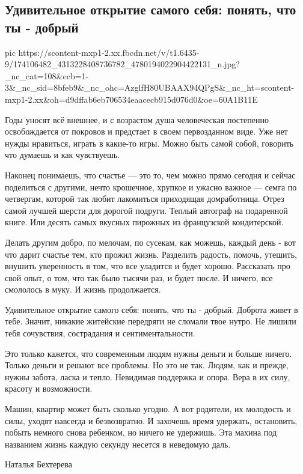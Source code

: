  
 
 
 
 
\subsection{Удивительное открытие самого себя: понять, что ты - добрый}
\label{sec:15_04_2021.fb.kotova_ksenia.1.dobro}

\ifcmt
  pic https://scontent-mxp1-2.xx.fbcdn.net/v/t1.6435-9/174106482_4313228408736782_4780194022904422131_n.jpg?_nc_cat=108&ccb=1-3&_nc_sid=8bfeb9&_nc_ohc=AzglfH80UBAAX94QPgS&_nc_ht=scontent-mxp1-2.xx&oh=d9dffab6eb706534eaacecb915d076d0&oe=60A1B11E
\fi

Годы уносят всё внешнее, и с возрастом душа человеческая постепенно
освобождается от покровов и предстает в своем первозданном виде. Уже нет нужды
нравиться, играть в какие-то игры. Можно быть самой собой, говорить что думаешь
и как чувствуешь.

Наконец понимаешь, что счастье — это то, чем можно прямо сегодня и сейчас
поделиться с другими, нечто крошечное, хрупкое и ужасно важное — семга по
четвергам, которой так любит лакомиться приходящая домработница. Отрез самой
лучшей шерсти для дорогой подруги. Теплый автограф на подаренной книге. Или
десять самых вкусных пирожных из французской кондитерской.

Делать другим добро, по мелочам, по сусекам, как можешь, каждый день - вот что
дарит счастье тем, кто прожил жизнь. Разделить радость, помочь, утешить,
внушить уверенность в том, что все уладится и будет хорошо. Рассказать про свой
опыт, о том, что так было тысячи раз, и будет после. И ничего, все смололось в
муку. И жизнь продолжается.

Удивительное открытие самого себя: понять, что ты - добрый. Доброта живет в
тебе. Значит, никакие житейские передряги не сломали твое нутро. Не лишили тебя
сочувствия, сострадания и сентиментальности.

Это только кажется, что современным людям нужны деньги и больше ничего. Только
деньги и решают все проблемы. Но это не так. Людям, как и прежде, нужны забота,
ласка и тепло. Невидимая поддержка и опора. Вера в их силу, красоту и
возможности.

Машин, квартир может быть сколько угодно. А вот родители, их молодость и силы,
уходят навсегда и безвозвратно. И захочешь время удержать, остановить, побыть
немного снова ребенком, но ничего не удержишь. Эта махина под названием жизнь
каждую секунду несется в неведомую даль.

Наталья Бехтерева
